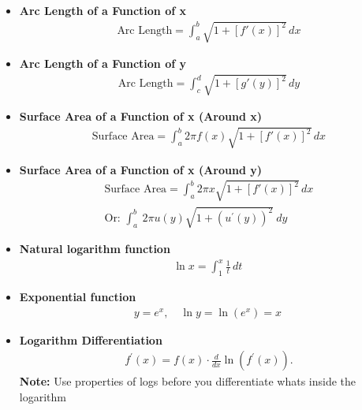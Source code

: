 \documentclass{report}
\begin{document}
\begin{itemize}
        \item \textbf{Arc Length of a Function of x}
            \begin{align}
                \text{Arc Length} = \int_{a}^{b} \sqrt{1 + [f'(x)]^2} \, dx
            \end{align}

        \item \textbf{Arc Length of a Function of y}
            \begin{align}
                \text{Arc Length} = \int_{c}^{d} \sqrt{1 + [g'(y)]^2} \, dy
            \end{align}

        \item \textbf{Surface Area of a Function of x (Around x)}
            \begin{align}
                \text{Surface Area} = \int_{a}^{b} 2\pi f(x) \sqrt{1 + [f'(x)]^2} \, dx
            \end{align}

        \item \textbf{Surface Area of a Function of x (Around y)}
            \begin{align}
                \text{Surface Area} = \int_{a}^{b} 2\pi x \sqrt{1 + [f'(x)]^2} \, dx \\
                \text{Or: } \int_{a}^{b}\ 2\pi u(y)\sqrt{1+(u^{\prime}(y))^{2}}\ dy
            \end{align}

        \item \textbf{Natural logarithm function}
            \begin{align}
                \ln x = \int_{1}^{x} \frac{1}{t} \, dt\
            \end{align}

        \item \textbf{Exponential function}
            \begin{align}
                y = e^x, \quad \ln y = \ln(e^x) = x\
            \end{align}

        \item  \textbf{Logarithm Differentiation}
            \begin{align*}
                f^{\prime}(x) = f(x) \cdot \frac{d}{dx}\ln{\left(f^{\prime}(x)\right)}
            .\end{align*}
            \textbf{Note:} Use properties of logs before you differentiate whats inside the logarithm


\end{itemize}
\end{document}
